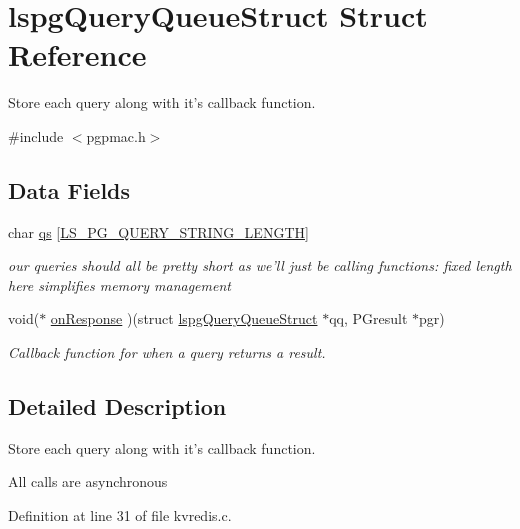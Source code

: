 \hypertarget{structlspgQueryQueueStruct}{\section{lspg\-Query\-Queue\-Struct Struct Reference}
\label{structlspgQueryQueueStruct}
}


Store each query along with it's callback function.  




{\ttfamily \#include $<$pgpmac.\-h$>$}

\subsection*{Data Fields}
\begin{DoxyCompactItemize}
\item 
char \hyperlink{structlspgQueryQueueStruct_a1389b3ec4ddf9ed5cc0344d229a7ff9e}{qs} \mbox{[}\hyperlink{pgpmac_8h_a3a8ef1b4b5994d6dd12bf74454ea891b}{L\-S\-\_\-\-P\-G\-\_\-\-Q\-U\-E\-R\-Y\-\_\-\-S\-T\-R\-I\-N\-G\-\_\-\-L\-E\-N\-G\-T\-H}\mbox{]}
\begin{DoxyCompactList}\small\item\em our queries should all be pretty short as we'll just be calling functions\-: fixed length here simplifies memory management \end{DoxyCompactList}\item 
void($\ast$ \hyperlink{structlspgQueryQueueStruct_a53bac5ae4cab775423940bff5092a831}{on\-Response} )(struct \hyperlink{structlspgQueryQueueStruct}{lspg\-Query\-Queue\-Struct} $\ast$qq, P\-Gresult $\ast$pgr)
\begin{DoxyCompactList}\small\item\em Callback function for when a query returns a result. \end{DoxyCompactList}\end{DoxyCompactItemize}


\subsection{Detailed Description}
Store each query along with it's callback function. 

All calls are asynchronous 

Definition at line 31 of file kvredis.\-c.



